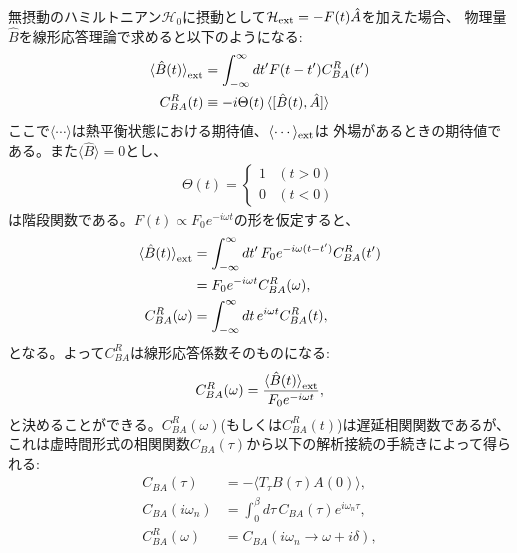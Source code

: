 \documentclass[10pt,a4j]{jarticle}
\begin{document}
無摂動のハミルトニアン$\mathcal{H}_0$に摂動として$\mathcal{H}_{\rm ext}=-F(t)\hat{A}$を加えた場合、
物理量$\hat{B}$を線形応答理論で求めると以下のようになる:\cite{Takada99}
\begin{align}
\braket{\hat{B}(t)}_{\rm ext} & = \int^{\infty}_{-\infty} dt^{\prime} F(t-t^{\prime}) C^{R}_{BA}(t^{\prime}) \\
C^{R}_{BA}(t) &\equiv -i \Theta (t) \braket{ [\hat{B}(t),\hat{A} ]}
\end{align}
ここで$\langle \cdots \rangle$は熱平衡状態における期待値、$\langle \cdots \rangle_{\rm ext}$は
外場があるときの期待値である。また$\langle \hat{B} \rangle=0$とし、
\begin{align}
\Theta(t) = \left\{ \begin{array}{ll} 1 & (t > 0) \\ 0 & (t < 0) \end{array} \right.
\end{align}
は階段関数である。$F(t) \propto F_0 e^{-i\omega t}$の形を仮定すると、
\begin{align}
\braket{\hat{B}(t)}_{\rm ext} & = \int^{\infty}_{-\infty} dt^{\prime} \, F_0 e^{-i\omega(t-t^\prime)} C^{R}_{BA}(t^{\prime}) \nonumber \\
& = F_0 e^{-i\omega t} C^{R}_{BA}(\omega), \\
C^{R}_{BA}(\omega) &= \int^{\infty}_{-\infty} dt \, e^{i\omega t} C^{R}_{BA}(t), 
\end{align}
となる。よって$C^{R}_{BA}$は線形応答係数そのものになる:
\begin{align}
C^{R}_{BA}(\omega) = \frac{\braket{\hat{B}(t)}_{\rm ext}}{F_0 e^{-i\omega t}},
\end{align}
と決めることができる。$C^{R}_{BA}(\omega)$(もしくは$C^{R}_{BA}(t)$)は遅延相関関数であるが、
これは虚時間形式の相関関数$C_{BA}(\tau)$から以下の解析接続の手続きによって得られる:
\begin{align}
C_{BA}(\tau) &= - \langle T_{\tau} B(\tau) A(0) \rangle , \\
C_{BA}(i\omega_n) & = \int_0^{\beta} d\tau \, C_{BA}(\tau) e^{i\omega_n \tau} , \\
C_{BA}^R(\omega) & = C_{BA}(i\omega_n \rightarrow \omega + i\delta), 
\end{align}
\end{document}
